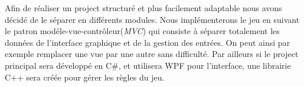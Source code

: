 Afin de réaliser un project structuré et plus facilement adaptable nous avons décidé de le séparer en différents modules. Nous implémenterons le jeu en suivant le patron modéle-vue-contrôleur(\emph{MVC}) qui consiste à séparer totalement les données de l'interface graphique et de la gestion des entrées. On peut ainsi par exemple remplacer une vue par une autre sans difficulté. Par ailleurs si le project principal sera développé en C\#, et utilisera WPF pour l'interface, une librairie C++ sera créée pour gérer les règles du jeu.